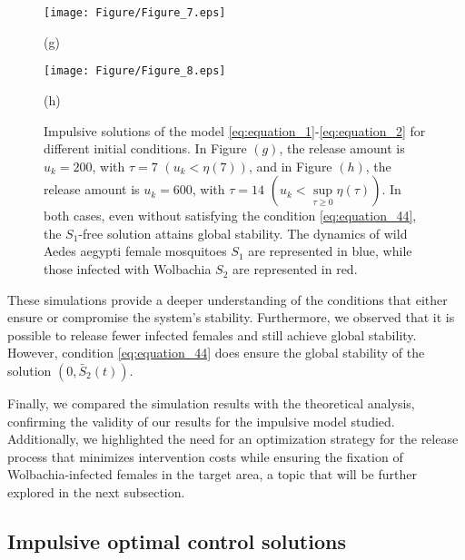 \documentclass[10pt,letterpaper]{article}
\begin{document}
\begin{figure}[!ht]
    \centering
    \begin{minipage}{0.45\textwidth}
        \centering
        \texttt{[image: Figure/Figure\_7.eps]}
        \par\vspace{2pt} (g)
    \end{minipage}
    \hfill
    \begin{minipage}{0.45\textwidth}
        \centering
        \texttt{[image: Figure/Figure\_8.eps]}
        \par\vspace{2pt} (h)
    \end{minipage}
   \caption{Impulsive solutions of the model \eqref{eq:equation_1}-\eqref{eq:equation_2} for different initial conditions. In Figure $(g)$, the release amount is $u_k = 200$, with $\tau=7$ $(u_k<\eta(7))$, and in Figure $(h)$, the release amount is $u_k = 600$, with $\tau=14$ $\left(u_k<\sup\limits_{\tau \geq 0} \eta(\tau)\right)$. In both cases, even without satisfying the condition \eqref{eq:equation_44}, the $S_1$-free solution attains global stability. The dynamics of wild Aedes aegypti female mosquitoes $S_1$ are represented in blue, while those infected with Wolbachia $S_2$ are represented in red.}
    \label{fig:4}
\end{figure}

These simulations provide a deeper understanding of the conditions that either ensure or compromise the system's stability. Furthermore, we observed that it is possible to release fewer infected females and still achieve global stability. However, condition \eqref{eq:equation_44} does ensure the global stability of the solution $(0, \bar{S}_2(t))$.

Finally, we compared the simulation results with the theoretical analysis, confirming the validity of our results for the impulsive model studied. Additionally, we highlighted the need for an optimization strategy for the release process that minimizes intervention costs while ensuring the fixation of Wolbachia-infected females in the target area, a topic that will be further explored in the next subsection.

\subsection{Impulsive optimal control solutions}
\end{document}
